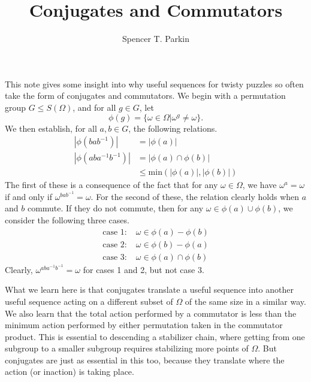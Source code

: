\documentclass[12pt]{article}
\title{Conjugates and Commutators}
\author{Spencer T. Parkin}
\begin{document}
\maketitle

This note gives some insight into why useful sequences for twisty puzzles so often take
the form of conjugates and commutators.  We begin with a permutation group $G\leq S(\Omega)$,
and for all $g\in G$, let
\begin{equation*}
\phi(g)=\{\omega\in\Omega|\omega^g\neq\omega\}.
\end{equation*}
We then establish, for all $a,b\in G$, the following relations.
\begin{align*}
|\phi(bab^{-1})|&=|\phi(a)|\\
|\phi(aba^{-1}b^{-1})|&=|\phi(a)\cap\phi(b)|\\
 &\leq\mbox{min}(|\phi(a)|,|\phi(b)|)
\end{align*}
The first of these is a consequence of the fact that for any $\omega\in\Omega$, we
have $\omega^a=\omega$ if and only if $\omega^{bab^{-1}}=\omega$.
For the second of these, the relation clearly holds when $a$ and $b$ commute.
If they do not commute, then for any $\omega\in\phi(a)\cup\phi(b)$,
we consider the following three cases.
\begin{align*}
\mbox{case 1:}\; & \omega\in\phi(a)-\phi(b)\\
\mbox{case 2:}\; & \omega\in\phi(b)-\phi(a)\\
\mbox{case 3:}\; & \omega\in\phi(a)\cap\phi(b)
\end{align*}
Clearly, $\omega^{aba^{-1}b^{-1}}=\omega$ for cases 1 and 2, but not case 3.

What we learn here is that conjugates translate a useful sequence into another useful
sequence acting on a different subset of $\Omega$ of the same size in a similar way.
We also learn that the total action performed by a commutator is less than the minimum
action performed by either permutation taken in the commutator product.  This is
essential to descending a stabilizer chain, where getting from one subgroup to a
smaller subgroup requires stabilizing more points of $\Omega$.  But conjugates are
just as essential in this too, because they translate where the action (or inaction)
is taking place.
\end{document}
